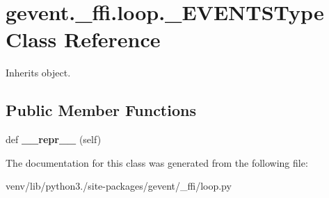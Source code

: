 \hypertarget{classgevent_1_1__ffi_1_1loop_1_1___e_v_e_n_t_s_type}{}\section{gevent.\+\_\+ffi.\+loop.\+\_\+\+E\+V\+E\+N\+T\+S\+Type Class Reference}
\label{classgevent_1_1__ffi_1_1loop_1_1___e_v_e_n_t_s_type}


Inherits object.

\subsection*{Public Member Functions}
\begin{DoxyCompactItemize}
\item 
\mbox{\label{classgevent_1_1__ffi_1_1loop_1_1___e_v_e_n_t_s_type_a2699ffdb0dbff1d5f2382f0993b837bb}} 
def {\bfseries \+\_\+\+\_\+repr\+\_\+\+\_\+} (self)
\end{DoxyCompactItemize}


The documentation for this class was generated from the following file\+:\begin{DoxyCompactItemize}
\item 
venv/lib/python3./site-\/packages/gevent/\+\_\+ffi/loop.\+py\end{DoxyCompactItemize}
